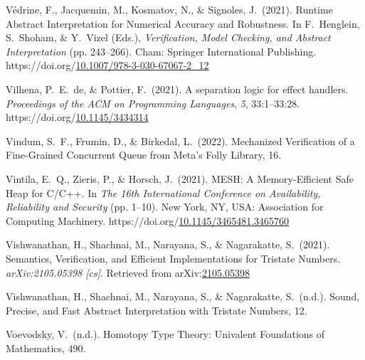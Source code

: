 \documentclass[12pt,twoside]{article}
\begin{document}
{\begin{thebibliography}{1079}
\mdbibitemlabel{}Védrine, F., Jacquemin, M., Kosmatov, N., \& Signoles, J.~(2021). Runtime Abstract Interpretation for Numerical Accuracy and Robustness. In F.~Henglein, S.~Shoham, \& Y.~Vizel (Eds.), \emph{Verification, Model Checking, and Abstract Interpretation} (pp. 243–266). Cham: Springer International Publishing. https://doi.org/\href{https://dx.doi.org/10.1007/978-3-030-67067-2_12}{10.1007/978-3-030-67067-2\_12}%

\mdbibitemlabel{}Vilhena, P.~E.~de, \& Pottier, F.~(2021). A separation logic for effect handlers. \emph{Proceedings of the ACM on Programming Languages}, \emph{5}, 33:1–33:28. https://doi.org/\href{https://dx.doi.org/10.1145/3434314}{10.1145/3434314}%

\mdbibitemlabel{}Vindum, S.~F., Frumin, D., \& Birkedal, L.~(2022). Mechanized Verification of a Fine-Grained Concurrent Queue from Meta’s Folly Library, 16.%

\mdbibitemlabel{}Vintila, E.~Q., Zieris, P., \& Horsch, J.~(2021). MESH: A Memory-Efficient Safe Heap for C/C++. In \emph{The 16th International Conference on Availability, Reliability and Security} (pp. 1–10). New York, NY, USA: Association for Computing Machinery. https://doi.org/\href{https://dx.doi.org/10.1145/3465481.3465760}{10.1145/3465481.3465760}%

\mdbibitemlabel{}Vishwanathan, H., Shachnai, M., Narayana, S., \& Nagarakatte, S.~(2021). Semantics, Verification, and Efficient Implementations for Tristate Numbers. \emph{arXiv:2105.05398 {}[cs]}. Retrieved from arXiv:\href{http://arxiv.org/abs/2105.05398}{2105.05398}%

\mdbibitemlabel{}Vishwanathan, H., Shachnai, M., Narayana, S., \& Nagarakatte, S.~(n.d.). Sound, Precise, and Fast Abstract Interpretation with Tristate Numbers, 12.%

\mdbibitemlabel{}Voevodsky, V.~(n.d.). Homotopy Type Theory: Univalent Foundations of Mathematics, 490.%


\end{thebibliography}}
\end{document}
